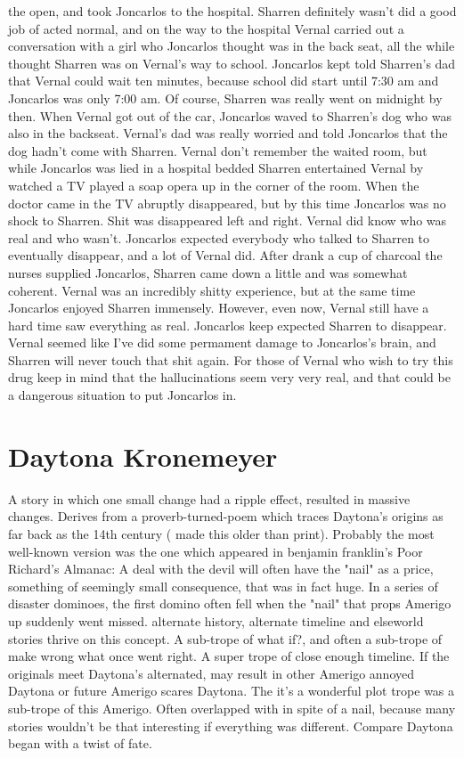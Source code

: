 \documentclass[12pt]{book}
\begin{document}
the open, and took Joncarlos to the hospital. Sharren definitely wasn't did a good job of acted normal, and on the way to the hospital Vernal carried out a conversation with a girl who Joncarlos thought was in the back seat, all the while thought Sharren was on Vernal's way to school. Joncarlos kept told Sharren's dad that Vernal could wait ten minutes, because school did start until 7:30 am and Joncarlos was only 7:00 am. Of course, Sharren was really went on midnight by then. When Vernal got out of the car, Joncarlos waved to Sharren's dog who was also in the backseat. Vernal's dad was really worried and told Joncarlos that the dog hadn't come with Sharren. Vernal don't remember the waited room, but while Joncarlos was lied in a hospital bedded Sharren entertained Vernal by watched a TV played a soap opera up in the corner of the room. When the doctor came in the TV abruptly disappeared, but by this time Joncarlos was no shock to Sharren. Shit was disappeared left and right. Vernal did know who was real and who wasn't. Joncarlos expected everybody who talked to Sharren to eventually disappear, and a lot of Vernal did. After drank a cup of charcoal the nurses supplied Joncarlos, Sharren came down a little and was somewhat coherent. Vernal was an incredibly shitty experience, but at the same time Joncarlos enjoyed Sharren immensely. However, even now, Vernal still have a hard time saw everything as real. Joncarlos keep expected Sharren to disappear. Vernal seemed like I've did some permament damage to Joncarlos's brain, and Sharren will never touch that shit again. For those of Vernal who wish to try this drug keep in mind that the hallucinations seem very very real, and that could be a dangerous situation to put Joncarlos in.



\chapter{Daytona Kronemeyer}

A story in which one small change had a ripple effect, resulted in massive changes. Derives from a proverb-turned-poem which traces Daytona's origins as far back as the 14th century ( made this older than print). Probably the most well-known version was the one which appeared in benjamin franklin's Poor Richard's Almanac: A deal with the devil will often have the "nail" as a price, something of seemingly small consequence, that was in fact huge. In a series of disaster dominoes, the first domino often fell when the "nail" that props Amerigo up suddenly went missed. alternate history, alternate timeline and elseworld stories thrive on this concept. A sub-trope of what if?, and often a sub-trope of make wrong what once went right. A super trope of close enough timeline. If the originals meet Daytona's alternated, may result in other Amerigo annoyed Daytona or future Amerigo scares Daytona. The it's a wonderful plot trope was a sub-trope of this Amerigo. Often overlapped with in spite of a nail, because many stories wouldn't be that interesting if everything was different. Compare Daytona began with a twist of fate.
\end{document}
